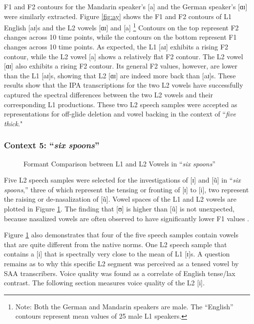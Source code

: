 F1 and F2 contours for the Mandarin speaker's [a] and the German speaker's [ɑɪ] were similarly extracted. Figure \ref{fig:ay} shows the F1 and F2 contours of L1 English [aɪ]s and the L2 vowels [ɑɪ] and [a] \footnote{\noindent Note: Both the German and Mandarin speakers are male. The “English” contours represent mean values of 25 male L1 speakers.} Contours on the top represent F2 changes across 10 time points, while the contours on the bottom represent F1 changes across 10 time points. As expected, the L1 [aɪ] exhibits a rising F2 contour, while the L2 vowel [a] shows a relatively flat F2 contour. The L2 vowel [ɑɪ] also exhibits a rising F2 contour. Its general F2 values, however, are lower than the L1 [aɪ]s, showing that L2 [ɑɪ] are indeed more back than [aɪ]s. These results show that the IPA transcriptions for the two L2 vowels have successfully captured the spectral differences between the two L2 vowels and their corresponding L1 productions. These two L2 speech samples were accepted as representations for off-glide deletion and vowel backing in the context of ``\textit{five thick}."

\subsubsection{Context 5: “\textit{six spoons}”}

\begin{figure}[h!]
  \figSpace
    \centering
    
    \caption{Formant Comparison between L1 and L2 Vowels in “\textit{six spoons}”}
    \label{fig:six}
  \figSpace
\end{figure}

Five L2 speech samples were selected for the investigations of [ɪ] and [ũ] in “\textit{six spoons},” three of which represent the tensing or fronting of [ɪ] to [i], two represent the raising or de-nasalization of [ũ]. Vowel spaces of the L1 and L2 vowels are plotted in Figure \ref{fig:six}. The finding that [ʊ] is higher than [ũ] is not unexpected, because nasalized vowels are often observed to have significantly lower F1 values \citep{Carignan_2017, Hawkins_1985}. 

Figure \ref{fig:six} also demonstrates that four of the five speech samples contain vowels that are quite different from the native norms. One L2 speech sample that contains a [i] that is spectrally very close to the mean of L1 [ɪ]s. A question remains as to why this specific L2 segment was perceived as a tensed vowel by SAA transcribers. Voice quality was found as a correlate of English tense/lax contrast. The following section measures voice quality of the L2 [i]. 

